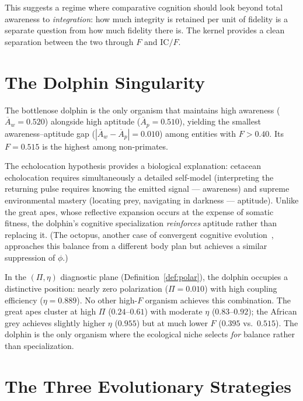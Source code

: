 \documentclass[
  aps,
  prd,
  twocolumn,
  superscriptaddress,
  nofootinbib,
  floatfix
]{revtex4-2}
\newcommand{\IC}{\mathrm{IC}}
\newcommand{\Aw}{\overline{A}_{\!w}}
\newcommand{\Ap}{\overline{A}_{\!p}}
\begin{document}
This suggests a regime where comparative cognition should look
beyond total awareness to \emph{integration}: how much
integrity is retained per unit of fidelity is a separate
question from how much fidelity there is.  The kernel provides
a clean separation between the two through $F$ and $\IC/F$.

\section{The Dolphin Singularity}\label{sec:dolphin}

The bottlenose dolphin is the only organism that maintains
high awareness ($\Aw = 0.520$) alongside high aptitude
($\Ap = 0.510$), yielding the smallest awareness--aptitude
gap ($|\Aw - \Ap| = 0.010$) among entities with $F > 0.40$.
Its $F = 0.515$ is the highest among non-primates.

The echolocation hypothesis provides a biological explanation:
cetacean echolocation requires simultaneously a detailed
self-model (interpreting the returning pulse requires knowing
the emitted signal --- awareness) and supreme environmental
mastery (locating prey, navigating in darkness --- aptitude).
Unlike the great apes, whose reflective expansion occurs at
the expense of somatic fitness, the dolphin's cognitive
specialization \emph{reinforces} aptitude rather than
replacing it.  (The octopus, another case of convergent
cognitive evolution~\cite{godfrey2016evolution}, approaches
this balance from a different body plan but achieves a
similar suppression of $\phi$.)

In the $(\Pi, \eta)$ diagnostic plane
(Definition~\ref{def:polar}), the dolphin occupies
a distinctive position: nearly zero polarization
($\Pi = 0.010$) with high coupling efficiency
($\eta = 0.889$).  No other high-$F$ organism achieves
this combination.  The great apes cluster at high
$\Pi$ ($0.24$--$0.61$) with moderate $\eta$ ($0.83$--$0.92$);
the African grey achieves slightly higher $\eta$ ($0.955$)
but at much lower $F$ ($0.395$ vs.~$0.515$).  The dolphin
is the only organism where the ecological niche selects
\emph{for} balance rather than specialization.

\section{The Three Evolutionary Strategies}\label{sec:strategies}
\end{document}

